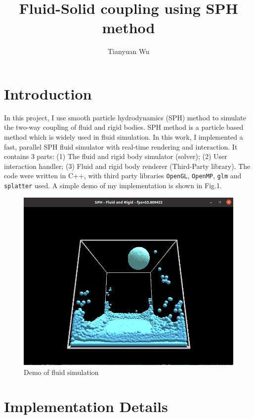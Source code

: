\documentclass[acmtog]{acmart}
\title{Fluid-Solid coupling using SPH method}
\author{Tianyuan Wu}
\begin{document}
\maketitle

\vspace*{2 ex}

\section{Introduction}
In this project, I use smooth particle hydrodynamics (SPH) method to simulate the two-way coupling of fluid and rigid bodies. 
SPH method is a particle based method which is widely used in fluid simulation. In this work, I implemented a fast, parallel 
SPH fluid simulator with real-time rendering and interaction. It contains 3 parts: (1) The fluid and rigid body simulator (solver); 
(2) User interaction handler; (3) Fluid and rigid body renderer (Third-Party library). The code were written in C++, 
with third party libraries \texttt{OpenGL}, \texttt{OpenMP}, \texttt{glm} and \texttt{splatter} used. A simple demo of 
my implementation is shown in Fig.1.
\begin{figure}[H]
    \centering
    \includegraphics[scale=0.2]{../1.png}
    \caption{Demo of fluid simulation}
\end{figure}

\section{Implementation Details}
\end{document}
